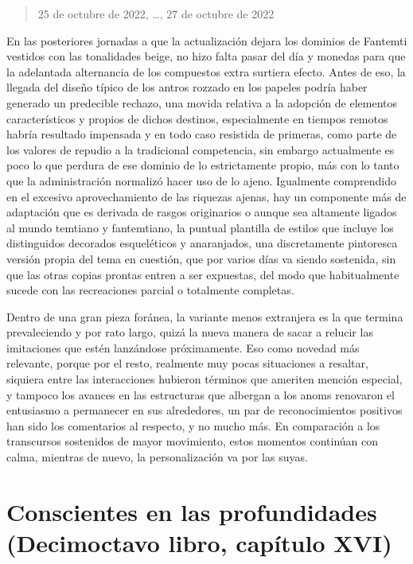 \documentclass[
]{book}
\begin{document}
\begin{quote}
25 de octubre de 2022, \ldots, 27 de octubre de 2022
\end{quote}

En las posteriores jornadas a que la actualización dejara los dominios de Fantemti vestidos con las tonalidades beige, no hizo falta pasar del día y monedas para que la adelantada alternancia de los compuestos extra surtiera efecto. Antes de eso, la llegada del diseño típico de los antros rozzado en los papeles podría haber generado un predecible rechazo, una movida relativa a la adopción de elementos característicos y propios de dichos destinos, especialmente en tiempos remotos habría resultado impensada y en todo caso resistida de primeras, como parte de los valores de repudio a la tradicional competencia, sin embargo actualmente es poco lo que perdura de ese dominio de lo estrictamente propio, más con lo tanto que la administración normalizó hacer uso de lo ajeno. Igualmente comprendido en el excesivo aprovechamiento de las riquezas ajenas, hay un componente más de adaptación que es derivada de rasgos originarios o aunque sea altamente ligados al mundo temtiano y fantemtiano, la puntual plantilla de estilos que incluye los distinguidos decorados esqueléticos y anaranjados, una discretamente pintoresca versión propia del tema en cuestión, que por varios días va siendo sostenida, sin que las otras copias prontas entren a ser expuestas, del modo que habitualmente sucede con las recreaciones parcial o totalmente completas.

Dentro de una gran pieza foránea, la variante menos extranjera es la que termina prevaleciendo y por rato largo, quizá la nueva manera de sacar a relucir las imitaciones que estén lanzándose próximamente. Eso como novedad más relevante, porque por el resto, realmente muy pocas situaciones a resaltar, siquiera entre las interacciones hubieron términos que ameriten mención especial, y tampoco los avances en las estructuras que albergan a los anoms renovaron el entusiasmo a permanecer en sus alrededores, un par de reconocimientos positivos han sido los comentarios al respecto, y no mucho más. En comparación a los transcursos sostenidos de mayor movimiento, estos momentos continúan con calma, mientras de nuevo, la personalización va por las suyas.

\hypertarget{conscientes-en-las-profundidades-decimoctavo-libro-capuxedtulo-xvi}{%
\section{Conscientes en las profundidades (Decimoctavo libro, capítulo XVI)}\label{conscientes-en-las-profundidades-decimoctavo-libro-capuxedtulo-xvi}}
\end{document}
